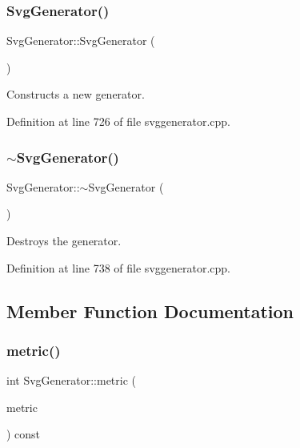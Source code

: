 \subsubsection{\texorpdfstring{Svg\+Generator()}{SvgGenerator()}}
{\footnotesize\ttfamily Svg\+Generator\+::\+Svg\+Generator (\begin{DoxyParamCaption}{ }\end{DoxyParamCaption})}

Constructs a new generator. 

Definition at line 726 of file svggenerator.\+cpp.

\mbox{\label{class_svg_generator_a3692f9cf5bfad1ba4e34048ce92cef83}} 
\subsubsection{\texorpdfstring{$\sim$\+Svg\+Generator()}{~SvgGenerator()}}
{\footnotesize\ttfamily Svg\+Generator\+::$\sim$\+Svg\+Generator (\begin{DoxyParamCaption}{ }\end{DoxyParamCaption})}

Destroys the generator. 

Definition at line 738 of file svggenerator.\+cpp.



\subsection{Member Function Documentation}
\mbox{\label{class_svg_generator_a04c1a05554a1fd618da5928049167c98}} 
\subsubsection{\texorpdfstring{metric()}{metric()}}
{\footnotesize\ttfamily int Svg\+Generator\+::metric (\begin{DoxyParamCaption}\item[{Q\+Paint\+Device\+::\+Paint\+Device\+Metric}]{metric }\end{DoxyParamCaption}) const\hspace{0.3cm}{\ttfamily [protected]}}



